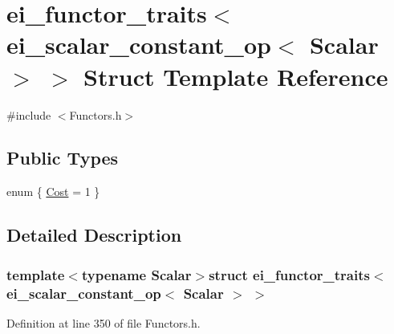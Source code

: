 \hypertarget{structei__functor__traits_3_01ei__scalar__constant__op_3_01_scalar_01_4_01_4}{\section{ei\-\_\-functor\-\_\-traits$<$ ei\-\_\-scalar\-\_\-constant\-\_\-op$<$ Scalar $>$ $>$ Struct Template Reference}
\label{structei__functor__traits_3_01ei__scalar__constant__op_3_01_scalar_01_4_01_4}
}


{\ttfamily \#include $<$Functors.\-h$>$}

\subsection*{Public Types}
\begin{DoxyCompactItemize}
\item 
enum \{ \hyperlink{structei__functor__traits_3_01ei__scalar__constant__op_3_01_scalar_01_4_01_4_af551cbbc432f4cc536be63901f25a450a6f6f4698f7d9c1d804e6e3a479cad172}{Cost} = 1
 \}
\end{DoxyCompactItemize}


\subsection{Detailed Description}
\subsubsection*{template$<$typename Scalar$>$struct ei\-\_\-functor\-\_\-traits$<$ ei\-\_\-scalar\-\_\-constant\-\_\-op$<$ Scalar $>$ $>$}



Definition at line 350 of file Functors.\-h.



